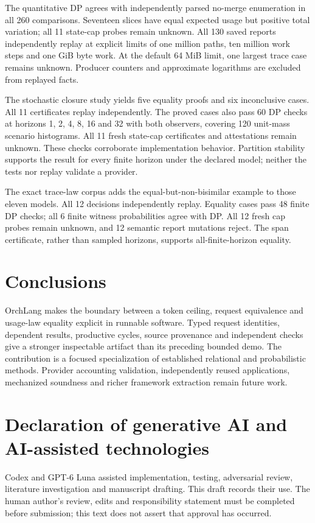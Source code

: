 \documentclass[preprint,12pt, a4paper]{elsarticle}
\begin{document}
The quantitative DP agrees with independently parsed no-merge enumeration in all 260 comparisons. Seventeen slices have equal expected usage but positive total variation; all 11 state-cap probes remain unknown. All 130 saved reports independently replay at explicit limits of one million paths, ten million work steps and one GiB byte work. At the default 64 MiB limit, one largest trace case remains unknown. Producer counters and approximate logarithms are excluded from replayed facts.

The stochastic closure study yields five equality proofs and six inconclusive cases. All 11 certificates replay independently. The proved cases also pass 60 DP checks at horizons 1, 2, 4, 8, 16 and 32 with both observers, covering 120 unit-mass scenario histograms. All 11 fresh state-cap certificates and attestations remain unknown. These checks corroborate implementation behavior. Partition stability supports the result for every finite horizon under the declared model; neither the tests nor replay validate a provider.

The exact trace-law corpus adds the equal-but-non-bisimilar example to those eleven models. All 12 decisions independently replay. Equality cases pass 48 finite DP checks; all 6 finite witness probabilities agree with DP. All 12 fresh cap probes remain unknown, and 12 semantic report mutations reject. The span certificate, rather than sampled horizons, supports all-finite-horizon equality.

\section{Conclusions}
OrchLang makes the boundary between a token ceiling, request equivalence and usage-law equality explicit in runnable software. Typed request identities, dependent results, productive cycles, source provenance and independent checks give a stronger inspectable artifact than its preceding bounded demo. The contribution is a focused specialization of established relational and probabilistic methods. Provider accounting validation, independently reused applications, mechanized soundness and richer framework extraction remain future work.

\section*{Declaration of generative AI and AI-assisted technologies}
Codex and GPT-6 Luna assisted implementation, testing, adversarial review, literature investigation and manuscript drafting. This draft records their use. The human author's review, edits and responsibility statement must be completed before submission; this text does not assert that approval has occurred.
\end{document}
